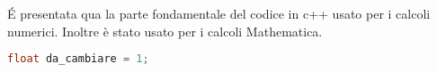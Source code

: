\'E presentata qua la parte fondamentale del codice in c++ usato per i calcoli numerici. Inoltre è stato usato per i calcoli Mathematica.

\begin{lstlisting}[language=C++]
float da_cambiare = 1;
\end{lstlisting}
